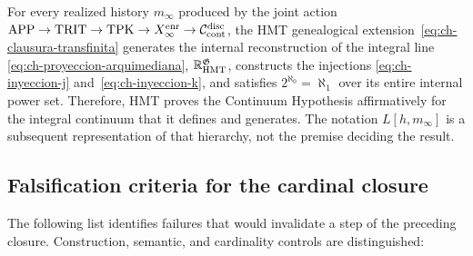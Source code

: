 \begin{theorem}
\label{thm:decision-continuo-hmt}
For every realized history
\(m_\infty\) produced by the joint action
\(\mathrm{APP}\to\mathrm{TRIT}\to\mathrm{TPK}\to
X_\infty^{\rm enr}\to\mathcal C_{\rm cont}^{\rm disc}\), the HMT genealogical
extension~\eqref{eq:ch-clausura-transfinita} generates the internal
reconstruction of the integral line
\eqref{eq:ch-proyeccion-arquimediana},
\(\mathbb R_{\rm HMT}^{\mathfrak G}\), constructs the injections
\eqref{eq:ch-inyeccion-j} and~\eqref{eq:ch-inyeccion-k}, and satisfies
\(2^{\aleph_0}=\aleph_1\) over its entire internal power set. Therefore, HMT
proves the Continuum Hypothesis affirmatively for the integral continuum that
it defines and generates. The notation \(L[h,m_\infty]\) is a subsequent
representation of that hierarchy, not the premise deciding the result.
\end{theorem}


\subsection{Falsification criteria for the cardinal closure}

The following list identifies failures that would invalidate a step of the
preceding closure. Construction, semantic, and cardinality controls are
distinguished:

